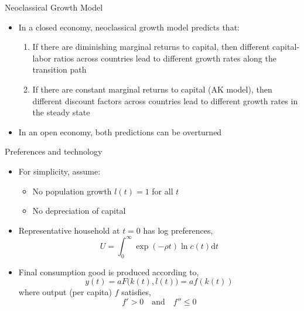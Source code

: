 \documentclass[10pt,notes=hide]{beamer}
\begin{document}
\begin{frame}{Neoclassical Growth Model}
\begin{itemize}
\item In a closed economy, neoclassical growth model predicts that:
\begin{enumerate}
\item If there are diminishing marginal returns to capital, then different capital-labor ratios across countries lead to different growth rates along the transition path
\item If there are constant marginal returns to capital (AK model), then different discount factors across countries lead to different growth rates in the steady state
\end{enumerate}
\item In an open economy, both predictions can be overturned
\end{itemize}
\end{frame}
\begin{frame}{Preferences and technology}
\begin{itemize}
\item For simplicity, assume:
	\begin{itemize}
	\item No population growth $l(t) = 1$ for all $t$
	\item No depreciation of capital
	\end{itemize}
\item Representative household at $t=0$ has log preferences,
\begin{equation}
U = \int_0^{\infty} \exp( - \rho t ) \ln c(t) \textrm{d}t \label{eq:ncg_pref}
\end{equation} 
\item Final consumption good is produced according to,
\[
y(t) = a F\big( k(t) , l(t) \big) = a f(k(t))
\]
where output (per capita) $f$ satisfies,
\[
f' > 0 \quad\text{and}\quad f'' \leq 0
\]
\end{itemize}
\end{frame}
\end{document}
